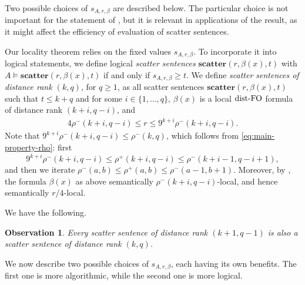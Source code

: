 \documentclass[11pt]{article}
\newtheorem{observation}[theorem]{Observation}
\theoremstyle{remark}
\renewcommand{\le}{\leqslant}
\renewcommand{\ge}{\geqslant}
\newcommand{\distFO}{\textrm{\upshape dist-FO}\xspace}
\begin{document}
    Two possible choices of $s_{A,r,\beta}$ are described below. The particular choice is not important for the statement of , but it is relevant in applications of the result, as it might affect the efficiency of evaluation of scatter sentences.

Our locality theorem relies on the fixed values $s_{A,r,\beta}$.
To incorporate it into logical statements, we define logical \emph{scatter sentences}
\(\textbf{scatter}(r,\beta(x),t)\) with \(A \models \textbf{scatter}(r,\beta(x),t)\) if and only if $s_{A,r,\beta}\ge t$.
We define \emph{scatter sentences of distance rank \((k,q)\)}, for \(q\ge 1\),
as all scatter sentences \(\mathbf{scatter}(r,\beta(x),t)\) such that
\(t\le k+q\) and
for some \(i\in\{1,\ldots,q\}\),
\(\beta(x)\) is a local \(\distFO\) formula of distance rank \((k+i,q-i)\), and 
\begin{align}\label{eq:scatter-radius}
4\rho^-(k+i,q-i)\le r\le 9^{k+i}\rho^-(k+i,q-i).
\end{align}
Note that
$9^{k+i}\rho^-(k+i,q-i)\le \rho^-(k,q)$, which follows from \eqref{eq:main-property-rho}: first
\[
    9^{k+i}\rho^-(k+i,q-i)
    \le \rho^+(k+i,q-i)
    \le \rho^-(k+i-1,q-i+1),
\]
and then we iterate \(\rho^-(a,b)\le \rho^+(a,b)\le \rho^-(a-1,b+1)\).
Moreover, by , the formula \(\beta(x)\) as above
semantically \(\rho^-(k+i,q-i)\)-local, and hence semantically \(r/4\)-local.


We have the following.


\begin{observation}\label{obs:preservescatterrank}
    Every scatter sentence of distance rank \((k+1,q-1)\) is also a scatter sentence of distance rank \((k,q)\).
\end{observation}

We now describe two possible choices of $s_{A,r,\beta}$, each having its own benefits. The first one is more algorithmic, while the second one is more logical.
\end{document}
